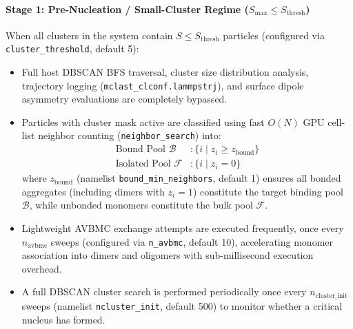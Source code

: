 \documentclass[final,5p,times,twocolumn]{elsarticle}
\begin{document}
\paragraph{Stage 1: Pre-Nucleation / Small-Cluster Regime ($S_{\max} \le S_{\text{thresh}}$)}
When all clusters in the system contain $S \le S_{\text{thresh}}$ particles (configured via \texttt{cluster\_threshold}, default 5):
\begin{itemize}
    \item Full host DBSCAN BFS traversal, cluster size distribution analysis, trajectory logging (\texttt{mclast\_clconf.lammpstrj}), and surface dipole asymmetry evaluations are completely bypassed.
    \item Particles with cluster mask active are classified using fast $O(N)$ GPU cell-list neighbor counting (\texttt{neighbor\_search}) into:
      \begin{align}
          \text{Bound Pool } \mathcal{B} &: \{ i \mid z_i \ge z_{\text{bound}} \} \\
          \text{Isolated Pool } \mathcal{F} &: \{ i \mid z_i = 0 \}
      \end{align}
      where $z_{\text{bound}}$ (namelist \texttt{bound\_min\_neighbors}, default 1) ensures all bonded aggregates (including dimers with $z_i = 1$) constitute the target binding pool $\mathcal{B}$, while unbonded monomers constitute the bulk pool $\mathcal{F}$.
    \item Lightweight AVBMC exchange attempts are executed frequently, once every $n_{\text{avbmc}}$ sweeps (configured via \texttt{n\_avbmc}, default 10), accelerating monomer association into dimers and oligomers with sub-millisecond execution overhead.
    \item A full DBSCAN cluster search is performed periodically once every $n_{\text{cluster\_init}}$ sweeps (namelist \texttt{ncluster\_init}, default 500) to monitor whether a critical nucleus has formed.
\end{itemize}
\end{document}
